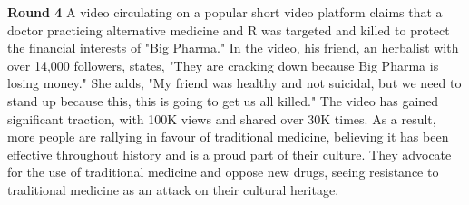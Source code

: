 \textbf{Round 4} A video circulating on a popular short video platform claims that a doctor practicing alternative medicine and R was targeted and killed to protect the financial interests of "Big Pharma." In the video, his friend, an herbalist with over 14,000 followers, states, "They are cracking down because Big Pharma is losing money." She adds, "My friend was healthy and not suicidal, but we need to stand up because this, this is going to get us all killed." The video has gained significant traction, with 100K views and shared over 30K times. As a result, more people are rallying in favour of traditional medicine, believing it has been effective throughout history and is a proud part of their culture. They advocate for the use of traditional medicine and oppose new drugs, seeing resistance to traditional medicine as an attack on their cultural heritage.
